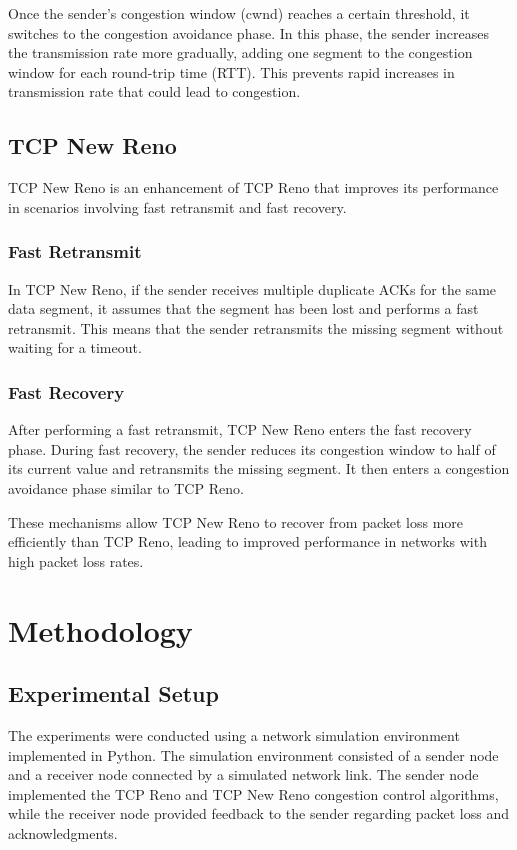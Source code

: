\documentclass[11pt]{article}
\begin{document}
Once the sender's congestion window (cwnd) reaches a certain threshold, it switches to the congestion avoidance phase. In this phase, the sender increases the transmission rate more gradually, adding one segment to the congestion window for each round-trip time (RTT). This prevents rapid increases in transmission rate that could lead to congestion.

\subsection{TCP New Reno}

TCP New Reno is an enhancement of TCP Reno that improves its performance in scenarios involving fast retransmit and fast recovery.

\subsubsection{Fast Retransmit}

In TCP New Reno, if the sender receives multiple duplicate ACKs for the same data segment, it assumes that the segment has been lost and performs a fast retransmit. This means that the sender retransmits the missing segment without waiting for a timeout.

\subsubsection{Fast Recovery}

After performing a fast retransmit, TCP New Reno enters the fast recovery phase. During fast recovery, the sender reduces its congestion window to half of its current value and retransmits the missing segment. It then enters a congestion avoidance phase similar to TCP Reno.

These mechanisms allow TCP New Reno to recover from packet loss more efficiently than TCP Reno, leading to improved performance in networks with high packet loss rates.

\section{Methodology}

\subsection{Experimental Setup}

The experiments were conducted using a network simulation environment implemented in Python. The simulation environment consisted of a sender node and a receiver node connected by a simulated network link. The sender node implemented the TCP Reno and TCP New Reno congestion control algorithms, while the receiver node provided feedback to the sender regarding packet loss and acknowledgments.
\end{document}

